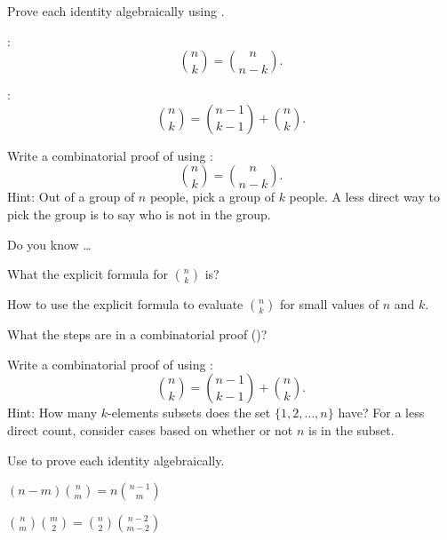 \begin{exer}[\exerU] %
\label{exer_factorial_proof_sym_recursion_pascal}
    Prove each identity algebraically using .
        \begin{exerpart}
            \item {}: $$\binom{n}{k} = \binom{n}{n-k}.$$
            \item {}: $$\binom{n}{k} = \binom{n-1}{k-1} + \binom{n}{k}.$$
        \end{exerpart}
\end{exer}

\begin{exer}[\exerU] %
\label{exer_arith_tri_prove_sym}
    Write a combinatorial proof of  using :
        $$\binom{n}{k} = \binom{n}{n-k}.$$ 
    Hint: Out of a group of $n$ people, pick a group of $k$ people.  A less direct way to pick the group is to say who is not in the group.
\end{exer}

\begin{exer}[\exerR] %
\label{exer_dyk_binom_formula}
    Do you know \ldots
        \begin{exerpart}
            \item What the explicit formula for $\binom{n}{k}$ is?
            \item How to use the explicit formula to evaluate $\binom{n}{k}$ for small values of $n$ and $k$.
            \item What the steps are in a combinatorial proof ()?  
        \end{exerpart}
\end{exer}

\begin{exer}[\exerE] %
\label{exer_comb_pf_recursion_arith_tri}
    Write a combinatorial proof of  using : 
        $$\binom{n}{k} = \binom{n-1}{k-1} + \binom{n}{k}.$$
    Hint: How many $k$-elements subsets does the set $\{1,2,\ldots,n\}$ have? For a less direct count, consider cases based on whether or not $n$ is in the subset.
\end{exer}

\begin{exer}[\exerE] %
\label{exer_binom_coeffs_verify_using_factorials}
    Use  to prove each identity algebraically.
        \begin{exerpart}
            \item $\displaystyle (n-m)\binom{n}{m} = n \binom{n-1}{m}$
            \item $\displaystyle \binom{n}{m}\binom{m}{2}=\binom{n}{2}\binom{n-2}{m-2}$
        \end{exerpart}
\end{exer}

